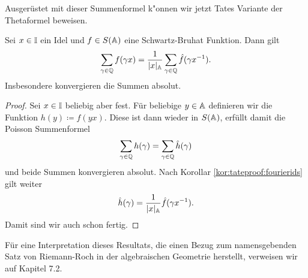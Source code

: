 	Ausgerüstet mit dieser Summenformel k"onnen wir jetzt Tates Variante der Thetaformel beweisen.
	\begin{satz}
	\label{satz:global:riemannroch}
		Sei $x \in \mathbb{I}$ ein Idel und $f\in S(\mathbb{A})$ eine Schwartz-Bruhat Funktion. Dann gilt
		\begin{align*}
			\sum_{\gamma \in \mathbb{Q}} {f(\gamma x)} = \frac{1}{|x|_{\mathbb{A}}}\sum_{\gamma \in \mathbb{Q}} {\hat{f}(\gamma x^{-1})}.
		\end{align*}
		Insbesondere konvergieren die Summen absolut.
	\end{satz}
	\begin{proof}
		Sei $x \in \mathbb{I}$ beliebig aber fest. 
		Für beliebige $y \in \mathbb{A}$ definieren wir die Funktion $h(y)\coloneqq f(yx)$. 
		Diese ist dann wieder in $S(\mathbb{A})$, erfüllt damit die Poisson Summenformel
		\begin{align*}
			\sum_{\gamma \in \mathbb{Q}}h(\gamma) = \sum_{\gamma \in \mathbb{Q}} \hat{h}(\gamma)
		\end{align*}
		und beide Summen konvergieren absolut.
		Nach Korollar \ref{kor:tateproof:fourierids} gilt weiter
		\begin{align*}
			\hat{h}(\gamma) 
				= \frac{1}{|x|_{\mathbb{A}}} \hat{f}(\gamma x^{-1}).
		\end{align*}
		Damit sind wir auch schon fertig.
	\end{proof}
	Für eine Interpretation dieses Resultats, die einen Bezug zum namensgebenden Satz von Riemann-Roch in der algebraischen Geometrie herstellt, verweisen wir auf \textcite{rama} Kapitel 7.2.
	
